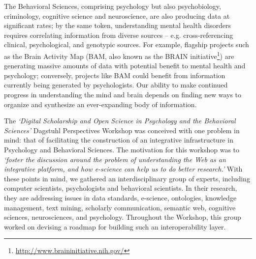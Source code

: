 \documentclass[a4paper,USenglish]{dagrep}
\begin{document}
The Behavioral Sciences, comprising psychology but also psychobiology,
criminology, cognitive science and neuroscience, are also producing data at
significant rates; by the same token, understanding mental health disorders
requires correlating information from diverse sources – e.g. cross-referencing
clinical, psychological, and genotypic sources. For example, flagship projects
such as the Brain Activity Map (BAM, also known as the BRAIN
initiative\footnote{\url{http://www.braininitiative.nih.gov/}}) are generating
massive amounts of data with potential benefit to mental health and psychology;
conversely, projects like BAM could benefit from information currently being
generated by psychologists. Our ability to make continued progress in
understanding the mind and brain depends on finding new ways to organize and
synthesize an ever-expanding body of information.

The \emph{`Digital Scholarship and Open Science in Psychology and the Behavioral
Sciences'} Dagstuhl Perspectives Workshop was conceived with one problem in
mind: that of facilitating the construction of an integrative infrastructure in
Psychology and Behavioral Sciences. The motivation for this workshop was to
\emph{`foster the discussion around the problem of understanding the Web as an
integrative platform, and how e-science can help us to do better research.'}
With these points in mind, we gathered an interdisciplinary group of experts,
including computer scientists, psychologists and behavioral scientists. In their
research, they are addressing issues in data standards, e-science, ontologies,
knowledge management, text mining, scholarly communication, semantic web,
cognitive sciences, neurosciences, and psychology. Throughout the Workshop, this
group worked on devising a roadmap for building such an interoperability layer. 
\end{document}
